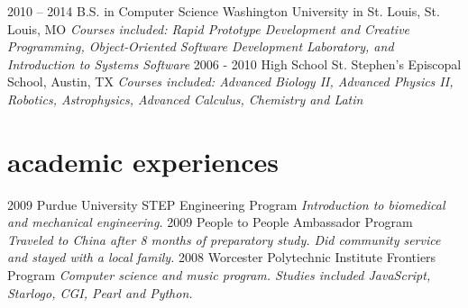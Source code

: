 \documentclass[]{cv}
\begin{document}
\begin{entrylist}
  \entry
    {2010 – 2014}
    {B.S. in Computer Science}
    {Washington University in St. Louis, St. Louis, MO}
    {\emph{Courses included: Rapid Prototype Development and Creative Programming, Object‐Oriented Software Development Laboratory, and Introduction to Systems Software}}
  \entry
    {2006 - 2010}
    {High School}
    {St. Stephen’s Episcopal School, Austin, TX}
    {\emph{Courses included: Advanced Biology II, Advanced Physics II, Robotics, Astrophysics, Advanced Calculus, Chemistry and Latin}}
\end{entrylist}

\section{academic experiences}

\begin{entrylist}
  \entry
    {2009}
    {Purdue University STEP Engineering Program}{}
    {\emph{Introduction to biomedical and mechanical engineering.}}
  \entry
    {2009}
    {People to People Ambassador Program}{}
    {\emph{Traveled to China after 8 months of preparatory study. Did community service and stayed with a local family.}}
  \entry
    {2008}
    {Worcester Polytechnic Institute Frontiers Program}{}
    {\emph{Computer science and music program. Studies included JavaScript, Starlogo, CGI, Pearl and Python.}}
\end{entrylist}
\end{document}
